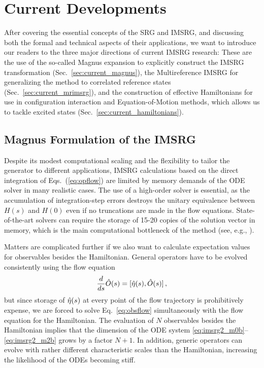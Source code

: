 {\section{\label{sec:current}Current Developments}
After covering the essential concepts of the SRG and IMSRG, and discussing
both the formal and technical aspects of their applications, we want to
introduce our readers to the three major directions of current IMSRG
research: These are the use of the so-called Magnus expansion to explicitly 
construct the IMSRG transformation (Sec.~\ref{sec:current_magnus}), the
Multireference IMSRG for generalizing the method to correlated 
reference states (Sec.~\ref{sec:current_mrimsrg}), and the construction
of effective Hamiltonians for use in configuration interaction and 
Equation-of-Motion methods, which allows us to tackle excited states 
(Sec.~\ref{sec:current_hamiltonians}).

\subsection{\label{sec:current_magnus}Magnus Formulation of the IMSRG}

Despite its modest computational scaling and the flexibility to tailor 
the generator to different applications, IMSRG calculations based on 
the direct integration of Eqs.~(\ref{eq:opflow}) are limited by memory 
demands of the ODE solver in many realistic cases. The use of a
high-order solver is essential, as the accumulation of integration-step
errors destroys the unitary equivalence between $H(s)$ and $H(0)$ even
if no truncations are made in the flow equations. State-of-the-art
solvers can require the storage of 15-20 copies of the solution vector
in memory, which is the main computational bottleneck of the method
(see, e.g., \cite{Hindmarsh:1983pd,Brown:1989qd,Hindmarsh:2005kl}).

Matters are complicated further if we also want to calculate expectation
values for observables besides the Hamiltonian. General operators have
to be evolved consistently using the flow equation 
\begin{equation} \label{eq:obsflow}
  \totd{}{s} \OO(s) = \comm{\etaO(s)}{\OO(s)}\,,
\end{equation}
but since storage of $\hat{\eta}(s)$ at every point of the flow trajectory
is prohibitively expense, we are forced to solve Eq.~\eqref{eq:obsflow} 
simultaneously with the flow equation for the Hamiltonian. The evaluation
of $N$ observables besides the Hamiltonian implies that the dimension of
the ODE system \eqref{eq:imsrg2_m0b}--\eqref{eq:imsrg2_m2b} grows by a
factor $N+1$. In addition, generic operators can evolve with rather different 
characteristic scales than the Hamiltonian, increasing the likelihood of 
the ODEs becoming stiff.

}
